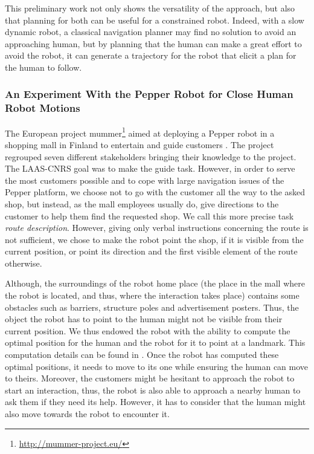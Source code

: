 \documentclass[a4paper,11pt,twoside]{StyleThese}
\begin{document}
This preliminary work not only shows the versatility of the approach, but also that planning for both can be useful for a constrained robot. Indeed, with a slow dynamic robot, a classical navigation planner may find no solution to avoid an approaching human, but by planning that the human can make a great effort to avoid the robot, it can generate a trajectory for the robot that elicit a plan for the human to follow.

\subsubsection{An Experiment With the Pepper Robot for Close Human Robot Motions}
The European project \acrshort{mummer}\footnote{\url{http://mummer-project.eu/}} aimed at deploying a Pepper robot in a shopping mall in Finland to entertain and guide customers \cite{foster2019mummer}. The project regrouped seven different stakeholders bringing their knowledge to the project. The LAAS-CNRS goal was to make the guide task. However, in order to serve the most customers possible and to cope with large navigation issues of the Pepper platform, we choose not to go with the customer all the way to the asked shop, but instead, as the mall employees usually do, give directions to the customer to help them find the requested shop. We call this more precise task \textit{route description}.
However, giving only verbal instructions concerning the route is not sufficient, we chose to make the robot point the shop, if it is visible from the current position, or point its direction and the first visible element of the route otherwise.

Although, the surroundings of the robot home place (the place in the mall where the robot is located, and thus, where the interaction takes place) contains some obstacles such as barriers, structure poles and advertisement posters. Thus, the object the robot has to point to the human might not be visible from their current position. We thus endowed the robot with the ability to compute the optimal position for the human and the robot for it to point at a landmark. This computation details can be found in \cite{waldhart_reasoning_shared_2019}. Once the robot has computed these optimal positions, it needs to move to its one while ensuring the human can move to theirs. Moreover, the customers might be hesitant to approach the robot to start an interaction, thus, the robot is also able to approach a nearby human to ask them if they need its help. However, it has to consider that the human might also move towards the robot to encounter it.
\end{document}
